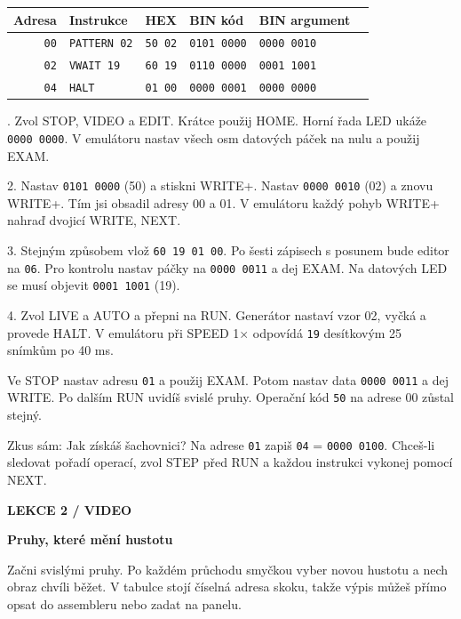 \documentclass[11pt,a4paper]{article}
\newcommand{\tagline}[1]{{\sffamily\bfseries\color{accent}\small #1}\par}
\newcommand{\titleline}[1]{{\sffamily\bfseries\fontsize{25}{29}\selectfont #1\par}\vspace{2mm}}
\newcommand{\sub}[1]{\par\vspace{2mm}{\sffamily\bfseries\large #1\par}\nobreak}
\newcommand{\note}[1]{\par\vspace{2mm}\noindent\colorbox{pale}{\parbox{.96\linewidth}{\raggedright #1}}\par}
\begin{document}
{\small\begin{tabularx}{\linewidth}{@{}rllllX@{}}\toprule
\textbf{Adresa} & \textbf{Instrukce} & \textbf{HEX} & \textbf{BIN kód} & \textbf{BIN argument} & \textbf{}\\\midrule
\texttt{00} & \texttt{PATTERN 02} & \texttt{50 02} & \texttt{0101 0000} & \texttt{0000 0010} & \\
\texttt{02} & \texttt{VWAIT 19} & \texttt{60 19} & \texttt{0110 0000} & \texttt{0001 1001} & \\
\texttt{04} & \texttt{HALT} & \texttt{01 00} & \texttt{0000 0001} & \texttt{0000 0000} & \\
\bottomrule\end{tabularx}}\par
\sub{Zadání přímo na panelu}
1. Zvol STOP, VIDEO a EDIT. Krátce použij HOME. Horní řada LED ukáže \texttt{0000 0000}. V emulátoru nastav všech osm datových páček na nulu a použij EXAM.

2. Nastav \texttt{0101 0000} (50) a stiskni WRITE+. Nastav \texttt{0000 0010} (02) a znovu WRITE+. Tím jsi obsadil adresy 00 a 01. V emulátoru každý pohyb WRITE+ nahraď dvojicí WRITE, NEXT.

3. Stejným způsobem vlož \texttt{60 19 01 00}. Po šesti zápisech s posunem bude editor na \texttt{06}. Pro kontrolu nastav páčky na \texttt{0000 0011} a dej EXAM. Na datových LED se musí objevit \texttt{0001 1001} (19).

4. Zvol LIVE a AUTO a přepni na RUN. Generátor nastaví vzor 02, vyčká a provede HALT. V emulátoru při SPEED 1\ensuremath{\times} odpovídá \texttt{19} desítkovým 25 snímkům po 40 ms.

\sub{Oprav jen argument}
Ve STOP nastav adresu \texttt{01} a použij EXAM. Potom nastav data \texttt{0000 0011} a dej WRITE. Po dalším RUN uvidíš svislé pruhy. Operační kód \texttt{50} na adrese 00 zůstal stejný.

\note{Zkus sám: Jak získáš šachovnici? Na adrese \texttt{01} zapiš \texttt{04} = \texttt{0000 0100}. Chceš-li sledovat pořadí operací, zvol STEP před RUN a každou instrukci vykonej pomocí NEXT.}
\clearpage
\tagline{LEKCE 2  /  VIDEO}
\titleline{Pruhy, které mění hustotu}
Začni svislými pruhy. Po každém průchodu smyčkou vyber novou hustotu a nech obraz chvíli běžet. V tabulce stojí číselná adresa skoku, takže výpis můžeš přímo opsat do assembleru nebo zadat na panelu.
\end{document}
